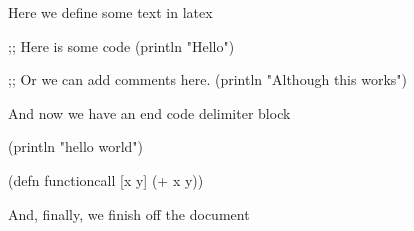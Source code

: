 

Here we define some text in latex

\begin{code}

;; Here is some code
(println "Hello")

;; Or we can add comments here.
(println "Although this works")

\end{code}

And now we have an end code delimiter block

\begin{code}
(println "hello world")

(defn functioncall [x y]
  (+ x y))
\end{code}

And, finally, we finish off the document




